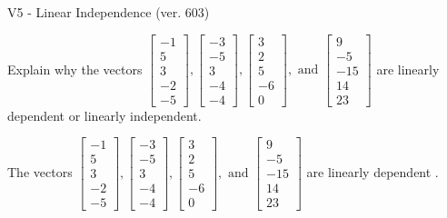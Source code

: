 \begin{exercise}
  \begin{exerciseTitle}V5 - Linear Independence (ver. 603)\end{exerciseTitle}
  \begin{exerciseStatement}
    Explain why the vectors \(\left[\begin{array}{r}
-1 \\
5 \\
3 \\
-2 \\
-5
\end{array}\right] , \left[\begin{array}{r}
-3 \\
-5 \\
3 \\
-4 \\
-4
\end{array}\right] , \left[\begin{array}{r}
3 \\
2 \\
5 \\
-6 \\
0
\end{array}\right] , \text{ and } \left[\begin{array}{r}
9 \\
-5 \\
-15 \\
14 \\
23
\end{array}\right]\) are linearly dependent or linearly independent.	


  \end{exerciseStatement}
  \begin{exerciseAnswer}
   The vectors \(\left[\begin{array}{r}
-1 \\
5 \\
3 \\
-2 \\
-5
\end{array}\right] , \left[\begin{array}{r}
-3 \\
-5 \\
3 \\
-4 \\
-4
\end{array}\right] , \left[\begin{array}{r}
3 \\
2 \\
5 \\
-6 \\
0
\end{array}\right] , \text{ and } \left[\begin{array}{r}
9 \\
-5 \\
-15 \\
14 \\
23
\end{array}\right]\) are 
  	 linearly dependent  .
  


  \end{exerciseAnswer}
\end{exercise}